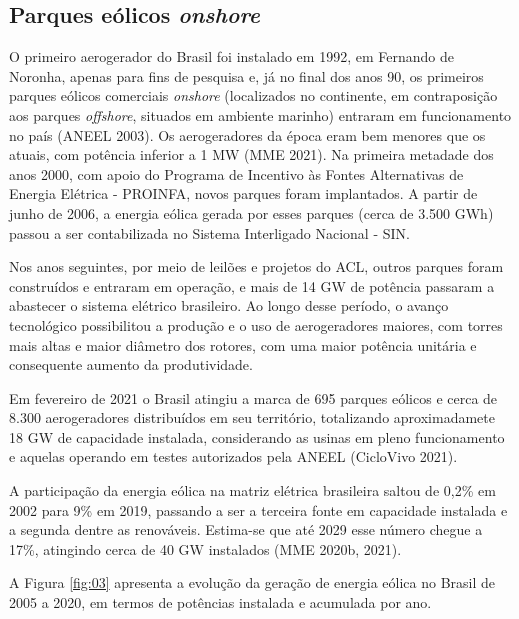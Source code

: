 \documentclass[
  oneside]{scrbook}
\begin{document}
\hypertarget{parques-euxf3licos-onshore}{%
\subsection{\texorpdfstring{Parques eólicos \emph{onshore}}{Parques eólicos onshore}}\label{parques-euxf3licos-onshore}}

O primeiro aerogerador do Brasil foi instalado em 1992, em Fernando de Noronha, apenas para fins de pesquisa e, já no final dos anos 90, os primeiros parques eólicos comerciais \emph{onshore} (localizados no continente, em contraposição aos parques \emph{offshore}, situados em ambiente marinho) entraram em funcionamento no país (ANEEL 2003). Os aerogeradores da época eram bem menores que os atuais, com potência inferior a 1 MW (MME 2021). Na primeira metadade dos anos 2000, com apoio do Programa de Incentivo às Fontes Alternativas de Energia Elétrica - PROINFA, novos parques foram implantados. A partir de junho de 2006, a energia eólica gerada por esses parques (cerca de 3.500 GWh) passou a ser contabilizada no Sistema Interligado Nacional - SIN.

Nos anos seguintes, por meio de leilões e projetos do ACL, outros parques foram construídos e entraram em operação, e mais de 14 GW de potência passaram a abastecer o sistema elétrico brasileiro. Ao longo desse período, o avanço tecnológico possibilitou a produção e o uso de aerogeradores maiores, com torres mais altas e maior diâmetro dos rotores, com uma maior potência unitária e consequente aumento da produtividade.

Em fevereiro de 2021 o Brasil atingiu a marca de 695 parques eólicos e cerca de 8.300 aerogeradores distribuídos em seu território, totalizando aproximadamete 18 GW de capacidade instalada, considerando as usinas em pleno funcionamento e aquelas operando em testes autorizados pela ANEEL (CicloVivo 2021).

A participação da energia eólica na matriz elétrica brasileira saltou de 0,2\% em 2002 para 9\% em 2019, passando a ser a terceira fonte em capacidade instalada e a segunda dentre as renováveis. Estima-se que até 2029 esse número chegue a 17\%, atingindo cerca de 40 GW instalados (MME 2020b, 2021).

A Figura \ref{fig:03} apresenta a evolução da geração de energia eólica no Brasil de 2005 a 2020, em termos de potências instalada e acumulada por ano.
\end{document}
